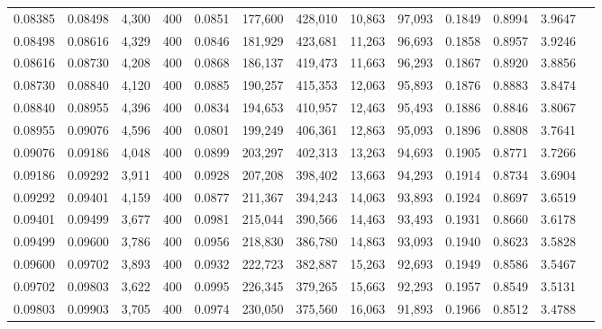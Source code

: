 \begin{tabular}{rrrrrrrrrrrrr}
0.08385 & 0.08498 &  4,300 & 400 &                                     0.0851 & 177,600 & 428,010 &  10,863 &  97,093 & 0.1849 & 0.8994 & 3.9647 \\
0.08498 & 0.08616 &  4,329 & 400 &                                     0.0846 & 181,929 & 423,681 &  11,263 &  96,693 & 0.1858 & 0.8957 & 3.9246 \\
0.08616 & 0.08730 &  4,208 & 400 &                                     0.0868 & 186,137 & 419,473 &  11,663 &  96,293 & 0.1867 & 0.8920 & 3.8856 \\
0.08730 & 0.08840 &  4,120 & 400 &                                     0.0885 & 190,257 & 415,353 &  12,063 &  95,893 & 0.1876 & 0.8883 & 3.8474 \\
0.08840 & 0.08955 &  4,396 & 400 &                                     0.0834 & 194,653 & 410,957 &  12,463 &  95,493 & 0.1886 & 0.8846 & 3.8067 \\
0.08955 & 0.09076 &  4,596 & 400 &                                     0.0801 & 199,249 & 406,361 &  12,863 &  95,093 & 0.1896 & 0.8808 & 3.7641 \\
0.09076 & 0.09186 &  4,048 & 400 &                                     0.0899 & 203,297 & 402,313 &  13,263 &  94,693 & 0.1905 & 0.8771 & 3.7266 \\
0.09186 & 0.09292 &  3,911 & 400 &                                     0.0928 & 207,208 & 398,402 &  13,663 &  94,293 & 0.1914 & 0.8734 & 3.6904 \\
0.09292 & 0.09401 &  4,159 & 400 &                                     0.0877 & 211,367 & 394,243 &  14,063 &  93,893 & 0.1924 & 0.8697 & 3.6519 \\
0.09401 & 0.09499 &  3,677 & 400 &                                     0.0981 & 215,044 & 390,566 &  14,463 &  93,493 & 0.1931 & 0.8660 & 3.6178 \\
0.09499 & 0.09600 &  3,786 & 400 &                                     0.0956 & 218,830 & 386,780 &  14,863 &  93,093 & 0.1940 & 0.8623 & 3.5828 \\
0.09600 & 0.09702 &  3,893 & 400 &                                     0.0932 & 222,723 & 382,887 &  15,263 &  92,693 & 0.1949 & 0.8586 & 3.5467 \\
0.09702 & 0.09803 &  3,622 & 400 &                                     0.0995 & 226,345 & 379,265 &  15,663 &  92,293 & 0.1957 & 0.8549 & 3.5131 \\
0.09803 & 0.09903 &  3,705 & 400 &                                     0.0974 & 230,050 & 375,560 &  16,063 &  91,893 & 0.1966 & 0.8512 & 3.4788 \\

\end{tabular}
